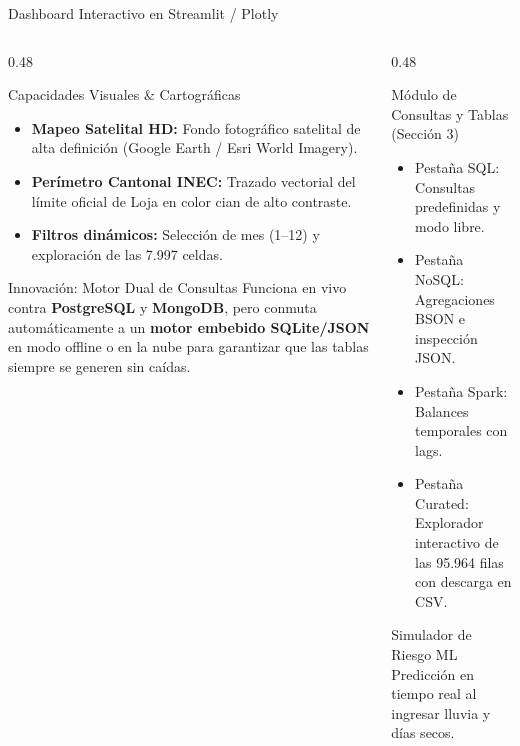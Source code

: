 \documentclass[aspectratio=169,11pt]{beamer}
\newcommand{\seccionactual}{Sustentaci\'on Final}
\begin{document}
\renewcommand{\seccionactual}{Dashboard}
\begin{frame}{Dashboard Interactivo en Streamlit / Plotly}
  \begin{columns}[t]
    \begin{column}{0.48\textwidth}
      \begin{block}{Capacidades Visuales \& Cartogr\'aficas}\scriptsize
        \begin{itemize}
          \item \textbf{Mapeo Satelital HD:} Fondo fotogr\'afico satelital de alta definici\'on (Google Earth / Esri World Imagery).
          \item \textbf{Per\'imetro Cantonal INEC:} Trazado vectorial del l\'imite oficial de Loja en color cian de alto contraste.
          \item \textbf{Filtros din\'amicos:} Selecci\'on de mes (1--12) y exploraci\'on de las 7.997 celdas.
        \end{itemize}
      \end{block}
      \vspace{0.5cm}
      \begin{alertblock}{Innovaci\'on: Motor Dual de Consultas}\scriptsize
        Funciona en vivo contra \textbf{PostgreSQL} y \textbf{MongoDB}, pero conmuta autom\'aticamente a un \textbf{motor embebido SQLite/JSON} en modo offline o en la nube para garantizar que las tablas siempre se generen sin ca\'idas.
      \end{alertblock}
    \end{column}
    \begin{column}{0.48\textwidth}
      \begin{exampleblock}{M\'odulo de Consultas y Tablas (Secci\'on 3)}\scriptsize
        \begin{itemize}
          \item Pesta\~na SQL: Consultas predefinidas y modo libre.
          \item Pesta\~na NoSQL: Agregaciones BSON e inspecci\'on JSON.
          \item Pesta\~na Spark: Balances temporales con lags.
          \item Pesta\~na Curated: Explorador interactivo de las 95.964 filas con descarga en CSV.
        \end{itemize}
      \end{exampleblock}
      \vspace{0.4cm}
      \begin{block}{Simulador de Riesgo ML}\scriptsize
        Predicci\'on en tiempo real al ingresar lluvia y d\'ias secos.
      \end{block}
    \end{column}
  \end{columns}
\end{frame}
\end{document}
